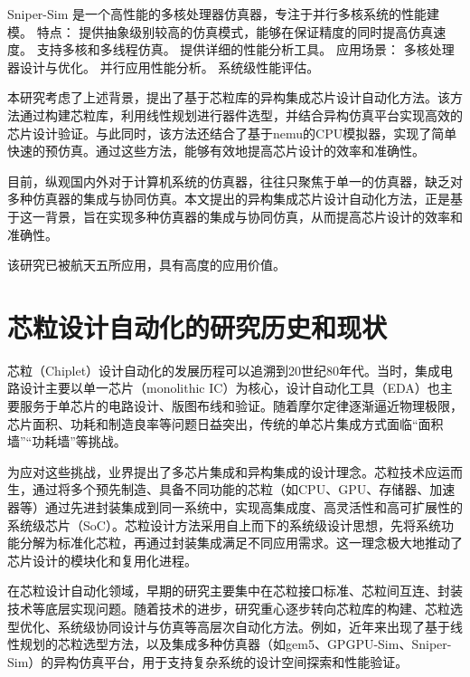 \documentclass[bachelor]{thesis-uestc}
\begin{document}
Sniper-Sim 是一个高性能的多核处理器仿真器，专注于并行多核系统的性能建模。
特点：
提供抽象级别较高的仿真模式，能够在保证精度的同时提高仿真速度。
支持多核和多线程仿真。
提供详细的性能分析工具。
应用场景：
多核处理器设计与优化。
并行应用性能分析。
系统级性能评估。

本研究考虑了上述背景，提出了基于芯粒库的异构集成芯片设计自动化方法。该方法通过构建芯粒库，利用线性规划进行器件选型，并结合异构仿真平台实现高效的芯片设计验证。与此同时，该方法还结合了基于nemu的CPU模拟器，实现了简单快速的预仿真。通过这些方法，能够有效地提高芯片设计的效率和准确性。

目前，纵观国内外对于计算机系统的仿真器，往往只聚焦于单一的仿真器，缺乏对多种仿真器的集成与协同仿真。本文提出的异构集成芯片设计自动化方法，正是基于这一背景，旨在实现多种仿真器的集成与协同仿真，从而提高芯片设计的效率和准确性。

该研究已被航天五所应用，具有高度的应用价值。

\section{芯粒设计自动化的研究历史和现状}

芯粒（Chiplet）设计自动化的发展历程可以追溯到20世纪80年代。当时，集成电路设计主要以单一芯片（monolithic IC）为核心，设计自动化工具（EDA）也主要服务于单芯片的电路设计、版图布线和验证。随着摩尔定律逐渐逼近物理极限，芯片面积、功耗和制造良率等问题日益突出，传统的单芯片集成方式面临“面积墙”“功耗墙”等挑战。

为应对这些挑战，业界提出了多芯片集成和异构集成的设计理念。芯粒技术应运而生，通过将多个预先制造、具备不同功能的芯粒（如CPU、GPU、存储器、加速器等）通过先进封装集成到同一系统中，实现高集成度、高灵活性和高可扩展性的系统级芯片（SoC）。芯粒设计方法采用自上而下的系统级设计思想，先将系统功能分解为标准化芯粒，再通过封装集成满足不同应用需求。这一理念极大地推动了芯片设计的模块化和复用化进程。

在芯粒设计自动化领域，早期的研究主要集中在芯粒接口标准、芯粒间互连、封装技术等底层实现问题。随着技术的进步，研究重心逐步转向芯粒库的构建、芯粒选型优化、系统级协同设计与仿真等高层次自动化方法。例如，近年来出现了基于线性规划的芯粒选型方法，以及集成多种仿真器（如gem5、GPGPU-Sim、Sniper-Sim）的异构仿真平台，用于支持复杂系统的设计空间探索和性能验证。
\end{document}
